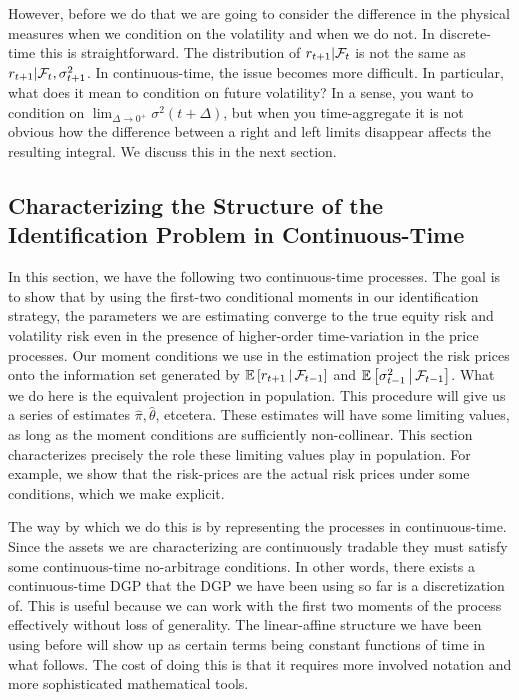 \documentclass[11pt, letterpaper, twoside, final]{article}
\begin{document}
However, before we do that we are going to consider the difference in the physical measures when we condition on
the volatility and when we do not.
In discrete-time this is straightforward.
The distribution of $ r_{t+1} \vert \mathcal{F}_t$ is not the same as $r_{t+1} \vert \mathcal{F}_t, \sigma^2_{t+1}$.
In continuous-time, the issue becomes more difficult.
In particular, what does it mean to condition on future volatility? 
In a sense, you want to condition on $\lim_{\Delta \to 0^{+}} \sigma^2(t+\Delta)$, but when you time-aggregate
it is not obvious how the difference between a right and left limits disappear affects the resulting integral.
We discuss this in the next section.

\subsection{Characterizing the Structure of the Identification Problem in Continuous-Time}

In this section, we have the following two continuous-time processes.
The goal is to show that by using the first-two conditional moments in our identification strategy, the parameters
we are estimating converge to the true equity risk and volatility risk even in the presence of higher-order
time-variation in the price processes.
Our moment conditions we use in the estimation project the risk prices onto the information set generated by
$\operatorname{\mathbb{E}}\left[r_{t+1}\,\middle\vert\, \mathcal{F}_{t-1}\right]$  and $\operatorname{\mathbb{E}}\left[\sigma^2_{t-1} \,\middle\vert\, \mathcal{F}_{t-1}\right]$.
What we do here is the equivalent projection in population.
This procedure will give us a series of estimates $\hat{\pi}, \hat{\theta}$, etcetera.
These estimates will have some limiting values, as long as the moment conditions are sufficiently non-collinear.
This section characterizes precisely the role these limiting values play in population.
For example, we show that the risk-prices are the actual risk prices under some conditions, which we make
explicit.

The way by which we do this is by representing the processes in continuous-time.
Since the assets we are characterizing are continuously tradable they must satisfy some continuous-time
no-arbitrage conditions. 
In other words, there exists a continuous-time DGP that the DGP we have been using so far is a discretization of. 
This is useful because we can work with the first two moments of the process effectively without loss of
generality.
The linear-affine structure we have been using before will show up as certain terms being constant functions of
time in what follows.
The cost of doing this is that it requires more involved notation and more sophisticated mathematical tools.
\end{document}
